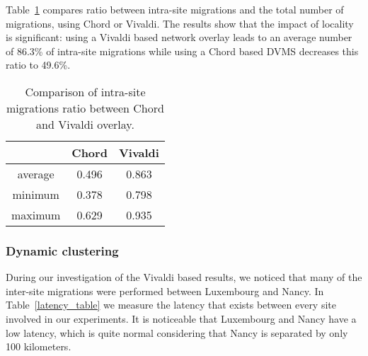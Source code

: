 Table~\ref{migration_table} compares ratio between intra-site migrations and the
total number of migrations, using Chord or Vivaldi. The results show that the impact of locality is
significant: using a Vivaldi based network overlay leads to an average number of
86.3\% of intra-site migrations while using a Chord based DVMS decreases this
ratio to 49.6\%.

\begin{table}

  \begin{center}
    \begin{tabular}{|c|c|c|}   

      \hline \multicolumn{1}{|p{3cm}|}{ }
       & \multicolumn{1}{|p{3cm}|}{\centering Chord }  & \multicolumn{1}{|p{3cm}|}{ \centering Vivaldi}  \\

      \hline
      average & 0.496 & 0.863 \\

      \hline
      minimum & 0.378 & 0.798 \\

      \hline
      maximum & 0.629 & 0.935 \\

      \hline
    \end{tabular}
  \end{center}
  \caption{\label{migration_table} Comparison of intra-site migrations ratio between Chord and Vivaldi overlay.}
\end{table}

\subsubsection{Dynamic clustering}

During our investigation of the Vivaldi based results, we noticed that many of
the inter-site migrations were performed between Luxembourg and Nancy. In 
Table~\ref{latency_table} we measure the latency that exists between every site
involved in our experiments. It is noticeable that Luxembourg and Nancy have a
low latency, which is quite normal considering that Nancy is separated by only
100 kilometers.



